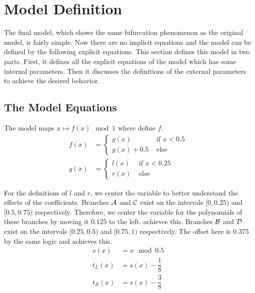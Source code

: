 \section{Model Definition}

The final model, which shows the same bifurcation phenomenon as the original model, is fairly simple.
Now there are no implicit equations and the model can be defined by the following explicit equations.
This section defines this model in two parts.
First, it defines all the explicit equations of the model which has some internal parameters.
Then it discusses the definitions of the external parameters to achieve the desired behavior.

\subsection{The Model Equations}

The model maps $x \mapsto f(x) \mod 1$ where  define $f$.
\begin{align}
    f(x) & = \begin{cases}
                 g(x)       & \text{ if } x < 0.5 \\
                 g(x) + 0.5 & \text{ else}
             \end{cases}
    \label{equ:final.def.f}
    \\
    g(x) & = \begin{cases}
                 l(x) & \text{ if } x < 0.25 \\
                 r(x) & \text{ else}
             \end{cases}
\end{align}

For the definitions of $l$ and $r$, we center the variable to better understand the effects of the coefficients.
Branches $\mathcal{A}$ and $\mathcal{C}$ exist on the intervals $[0, 0.25)$ and $[0.5, 0.75)$ respectively.
Therefore, we center the variable for the polynomials of these branches by moving it $0.125$ to the left.
 achieves this.
Branches $\mathcal{B}$ and $\mathcal{D}$ exist on the intervals $[0.25, 0.5)$ and $[0.75, 1)$ respectively.
The offset here is $0.375$ by the same logic and  achieves this.
\begin{align}
    s(x)   & = x \mod 0.5                                   \\
    t_L(x) & = s(x) - \dfrac{1}{8} \label{equ:final.def.tl} \\
    t_R(x) & = s(x) - \dfrac{3}{8} \label{equ:final.def.tr}
\end{align}

